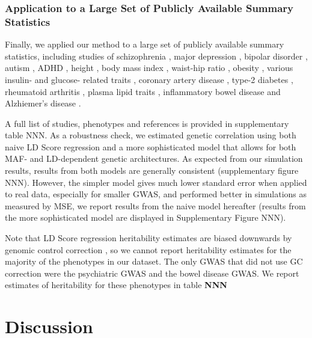 \documentclass[11pt]{article}
\numberwithin{equation}{section}
\begin{document}
\subsubsection{Application to a Large Set of Publicly Available Summary Statistics}
Finally, we applied our method to a large set of publicly available summary statistics, 
including studies of 
schizophrenia \cite{schizophrenia2014biological}, 
major depression \cite{ripke2012mega}, 
bipolar disorder \cite{sklar2011large}, 
autism \cite{cross2013identification},
ADHD \cite{neale2010meta},
height \cite{allen2010hundreds}, 
body mass index \cite{speliotes2010association}, 
waist-hip ratio \cite{heid2010meta}, 
obesity \cite{berndt2013genome}, 
various insulin- and glucose- related traits
\cite{prokopenko2014central,scott2012large,manning2012genome,strawbridge2011genome,saxena2010genetic,dupuis2010new,soranzo2010common},
coronary artery disease \cite{schunkert2011large}, 
type-2 diabetes \cite{morris2012large}, 
rheumatoid arthritis \cite{stahl2010genome}, 
plasma lipid traits \cite{teslovich2010biological},
inflammatory bowel disease \cite{jostins2012host} and 
Alzhiemer's disease \cite{lambert2013meta}.

A full list of studies, phenotypes and references is provided in supplementary table NNN.
As a robustness check, we estimated genetic correlation using both naive LD Score regression
and a more sophisticated model that allows for both MAF- and LD-dependent genetic architectures.
As expected from our simulation results, results from both models are generally consistent (supplementary figure NNN). 
However, the simpler model gives much lower standard error when applied to real data, especially for smaller GWAS, 
and performed better in simulations as measured by MSE,
we report results from the naive model hereafter (results from the more sophisticated model are displayed in Supplementary Figure NNN).

Note that LD Score regression heritability estimates are biased downwards by genomic control correction \cite{buliksullivan2014}, so we cannot report heritability estimates for the majority of the phenotypes in our dataset. 
The only GWAS that did not use GC correction were the psychiatric GWAS and the bowel disease GWAS. 
We report estimates of heritability for these phenotypes in table \textbf{NNN}

\section{Discussion}\label{Discussion}
\end{document}
